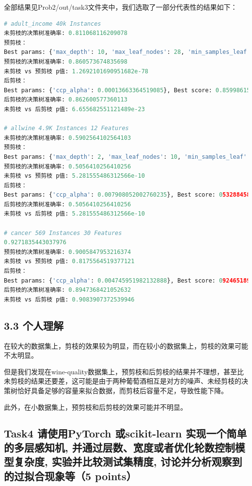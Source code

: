 \documentclass[8pt]{article}
\begin{document}
全部结果见Prob2/out/task3文件夹中，我们选取了一部分代表性的结果如下：

\begin{lstlisting}[breaklines=true, language=Python, caption=输出结果]
# adult_income 40k Instances
未剪枝的决策树准确率: 0.811068116209078
预剪枝：
Best params: {'max_depth': 10, 'max_leaf_nodes': 28, 'min_samples_leaf': 1,'min_samples_split': 2}, Best score: 0.855010716612513
预剪枝的决策树准确率: 0.860573674835698
未剪枝 vs 预剪枝 p值: 1.2692101690951682e-78
后剪枝：
Best params: {'ccp_alpha': 0.00013663364519085}, Best score: 0.8599861513035167
后剪枝的决策树准确率: 0.862600577360113
未剪枝 vs 后剪枝 p值: 6.655682551121489e-23

# allwine 4.9K Instances 12 Features
未剪枝的决策树准确率: 0.5902564102564103
预剪枝：
Best params: {'max_depth': 2, 'max_leaf_nodes': 10, 'min_samples_leaf': 1,'min_samples_split': 2}, Best score: 0.5328845851618129
预剪枝的决策树准确率: 0.5056410256410256
未剪枝 vs 预剪枝 p值: 5.281555486312566e-10
后剪枝：
Best params: {'ccp_alpha': 0.007908052002760235}, Best score: 05328845851618129
后剪枝的决策树准确率: 0.5056410256410256
未剪枝 vs 后剪枝 p值: 5.281555486312566e-10

# cancer 569 Instances 30 Features
0.9271835443037976
预剪枝的决策树准确率: 0.9005847953216374
未剪枝 vs 预剪枝 p值: 0.8175564519377121
后剪枝：
Best params: {'ccp_alpha': 0.004745951982132888}, Best score: 09246518987341773
后剪枝的决策树准确率: 0.8947368421052632
未剪枝 vs 后剪枝 p值: 0.9083907372539946
\end{lstlisting}

\subsection*{3.3 个人理解}

在较大的数据集上，剪枝的效果较为明显，而在较小的数据集上，剪枝的效果可能不太明显。

但是我们发现在wine-quality数据集上，预剪枝和后剪枝的结果并不理想，甚至比未剪枝的结果还要差，这可能是由于两种葡萄酒相互是对方的噪声、未经剪枝的决策树恰好具备足够的容量来拟合数据，而剪枝后容量不足，导致性能下降。

此外，在小数据集上，预剪枝和后剪枝的效果可能并不明显。

\subsection*{Task4 请使用PyTorch 或scikit-learn 实现一个简单的多层感知机, 并通过层数、宽度或者优化轮数控制模型复杂度, 实验并比较测试集精度, 讨论并分析观察到的过拟合现象等（5 points）}
\end{document}
